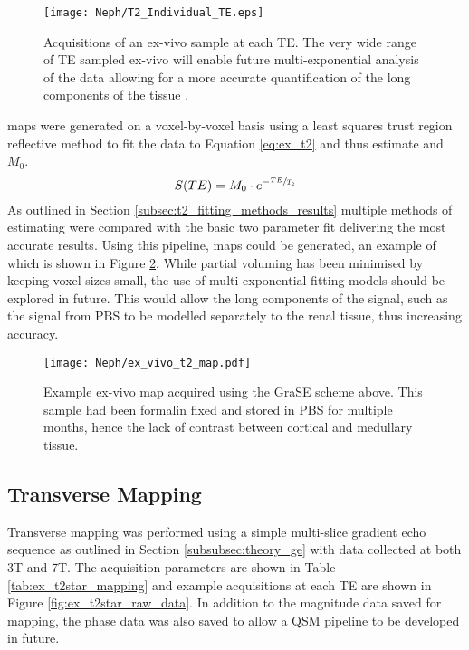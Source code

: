 \begin{figure}[H]
	\centering
	\texttt{[image: Neph/T2\_Individual\_TE.eps]}
	\caption{Acquisitions of an ex-vivo sample at each \ac{TE}. The very wide range of \ac{TE} sampled ex-vivo will enable future multi-exponential analysis of the data allowing for a more accurate quantification of the long \ttwo components of the tissue \cite{bjarnason_analyzennls_2010, sabouri_mr_2017}.}
	\label{fig:ex_t2_raw_data}	
\end{figure}

\ttwo maps were generated on a voxel-by-voxel basis using a least squares trust region reflective method to fit the data to Equation \eqref{eq:ex_t2} and thus estimate \ttwo and $M_0$. 
\begin{equation}
	S(TE) = M_0 \cdot e^{-\sfrac{TE}{T_2}}
	\label{eq:ex_t2}
\end{equation}
As outlined in Section \ref{subsec:t2_fitting_methods_results} multiple methods of estimating \ttwo were compared with the basic two parameter fit delivering the most accurate results. Using this pipeline, \ttwo maps could be generated, an example of which is shown in Figure \ref{fig:ex_t2_map}. While partial voluming has been minimised by keeping voxel sizes small, the use of multi-exponential fitting models should be explored in future. This would allow the long \ttwo components of the signal, such as the signal from \ac{PBS} to be modelled separately to the renal tissue, thus increasing accuracy. 

\begin{figure}[H]
	\centering
	\texttt{[image: Neph/ex\_vivo\_t2\_map.pdf]}
	\caption{Example ex-vivo \ttwo map acquired using the \ac{GraSE} scheme above. This sample had been formalin fixed and stored in \ac{PBS} for multiple months, hence the lack of contrast between cortical and medullary tissue.}
	\label{fig:ex_t2_map}
\end{figure}

\subsection{Transverse \ttwostar Mapping}

Transverse \ttwostar mapping was performed using a simple multi-slice gradient echo sequence as outlined in Section \ref{subsubsec:theory_ge} with data collected at both 3T and 7T. The acquisition parameters are shown in Table \ref{tab:ex_t2star_mapping} and example acquisitions at each \ac{TE} are shown in Figure \ref{fig:ex_t2star_raw_data}. In addition to the magnitude data saved for \ttwostar mapping, the phase data was also saved to allow a \ac{QSM} pipeline to be developed in future.

